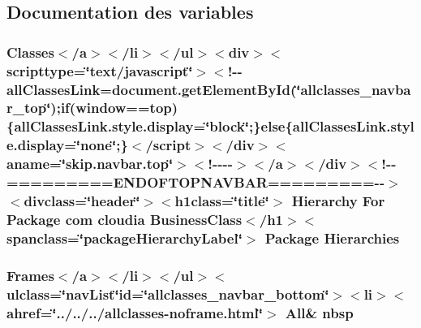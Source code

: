 \subsection{Documentation des variables}
\hypertarget{com_2cloudia_2_business_class_2package-tree_8html_a61756be46a402af7f615c5804b0f0b50}{
\subsubsection[{Hierarchies}]{\setlength{\rightskip}{0pt plus 5cm}Classes$<$/{\bf a}$>$$<$/li$>$$<$/ul$>$$<$div$>$$<$scripttype=\char`\"{}text/javascript\char`\"{}$>$$<$!-\/-\/all\-Classes\-Link=document.\-get\-Element\-By\-Id(\char`\"{}allclasses\-\_\-navbar\-\_\-top\char`\"{});if(window==top)\{all\-Classes\-Link.\-style.\-display=\char`\"{}block\char`\"{};\}else\{all\-Classes\-Link.\-style.\-display=\char`\"{}none\char`\"{};\}$<$/script$>$$<$/div$>$$<$aname=\char`\"{}skip.\-navbar.\-top\char`\"{}$>$$<$!-\/-\/-\/-\/$>$$<$/a$>$$<$/div$>$$<$!-\/-\/=========E\-N\-D\-O\-F\-T\-O\-P\-N\-A\-V\-B\-A\-R=========-\/-\/$>$$<$divclass=\char`\"{}header\char`\"{}$>$$<$h1class=\char`\"{}title\char`\"{}$>$ Hierarchy For Package com cloudia Business\-Class$<$/h1$>$$<$spanclass=\char`\"{}package\-Hierarchy\-Label\char`\"{}$>$ Package Hierarchies}}\label{com_2cloudia_2_business_class_2package-tree_8html_a61756be46a402af7f615c5804b0f0b50}
\hypertarget{com_2cloudia_2_business_class_2package-tree_8html_aff329d23a24e17d925e4078265e1c7cf}{
\subsubsection[{nbsp}]{\setlength{\rightskip}{0pt plus 5cm}Frames$<$/{\bf a}$>$$<$/li$>$$<$/ul$>$$<$ulclass=\char`\"{}nav\-List\char`\"{}id=\char`\"{}allclasses\-\_\-navbar\-\_\-bottom\char`\"{}$>$$<$li$>$$<$ahref=\char`\"{}../../../allclasses-\/noframe.\-html\char`\"{}$>$ All\& nbsp}}\label{com_2cloudia_2_business_class_2package-tree_8html_aff329d23a24e17d925e4078265e1c7cf}
